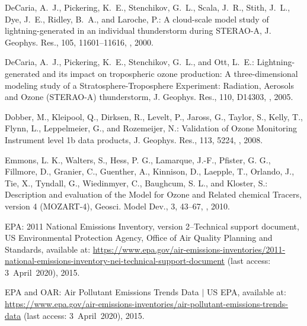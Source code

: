 \documentclass[amt]{copernicus}
\begin{document}
\begin{thebibliography}{105}
DeCaria, A.~J., Pickering, K.~E., Stenchikov, G.~L., Scala, J.~R., Stith,
  J.~L., Dye, J.~E., Ridley, B.~A., and Laroche, P.: A cloud-scale model study
  of lightning-generated  in an individual thunderstorm
  during STERAO-A, J. Geophys. Res., 105, 11601--11616,
  , 2000.

DeCaria, A.~J., Pickering, K.~E., Stenchikov, G.~L., and Ott, L.~E.:
  Lightning-generated  and its impact on tropospheric ozone
  production: A three-dimensional modeling study of a Stratosphere-Troposphere
  Experiment: Radiation, Aerosols and Ozone (STERAO-A) thunderstorm,
  J. Geophys. Res., 110,  D14303, , 2005.

Dobber, M., Kleipool, Q., Dirksen, R., Levelt, P., Jaross, G., Taylor, S.,
  Kelly, T., Flynn, L., Leppelmeier, G., and Rozemeijer, N.: Validation of
  Ozone Monitoring Instrument level 1b data products, J. Geophys. Res., 113, 5224, , 2008.

Emmons, L. K., Walters, S., Hess, P. G., Lamarque, J.-F., Pfister, G. G., Fillmore, D., Granier, C., Guenther, A., Kinnison, D., Laepple, T., Orlando, J., Tie, X., Tyndall, G., Wiedinmyer, C., Baughcum, S. L., and Kloster, S.: Description and evaluation of the Model for Ozone and Related chemical Tracers, version 4 (MOZART-4), Geosci. Model Dev., 3, 43–67, , 2010.

EPA: 2011 National Emissions Inventory, version 2--Technical support
  document, US Environmental Protection Agency, Office of Air Quality Planning
  and Standards, available at: \url{https://www.epa.gov/air-emissions-inventories/2011-national-emissions-inventory-nei-technical-support-document} (last access: 3~April~2020), 2015.

EPA and OAR: Air Pollutant Emissions Trends Data $|$ US EPA,
available at: \url{https://www.epa.gov/air-emissions-inventories/air-pollutant-emissions-trends-data} (last access: 3~April~2020),
  2015.


\end{thebibliography}
\end{document}

